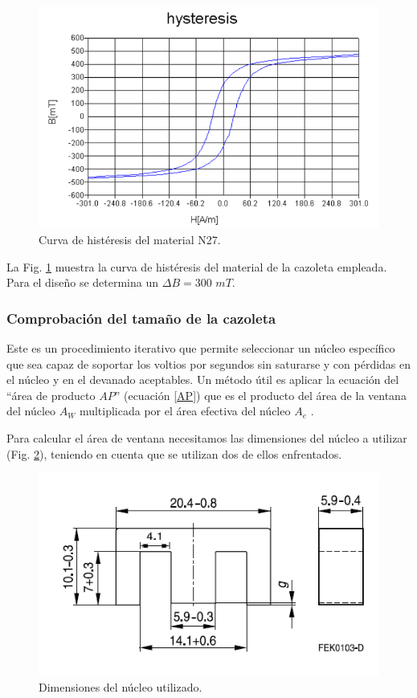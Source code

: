 \documentclass[11pt, a4paper]{article}
\begin{document}
\begin{figure}[h]
	\centering
	\includegraphics[width = 10 cm]{Imagenes/n27}
	\caption{Curva de histéresis del material N27.}
	\label{n27}
\end{figure}

La Fig. \ref{n27} muestra la curva de histéresis del material de la cazoleta empleada. Para el diseño se determina un $\Delta B = 300$ $mT$.
\subsubsection{Comprobación del tamaño de la cazoleta}
Este es un procedimiento iterativo que permite seleccionar un núcleo específico que sea capaz de soportar los voltios por segundos sin saturarse y con pérdidas en el núcleo y en el devanado aceptables. 
Un método útil es aplicar la ecuación del “área de producto $AP$” (ecuación \ref{AP}) que es el producto del área de la ventana del núcleo $A_W$ multiplicada por el área efectiva del núcleo $A_e$ . 

Para calcular el área de ventana necesitamos las dimensiones del núcleo a utilizar (Fig. \ref{cazoleta}), teniendo en cuenta que se utilizan dos de ellos enfrentados.

\begin{figure}[h]
	\centering
	\includegraphics[width = 10 cm]{Imagenes/cazoleta}
	\caption{Dimensiones del núcleo utilizado.}
	\label{cazoleta}
\end{figure}
\end{document}
